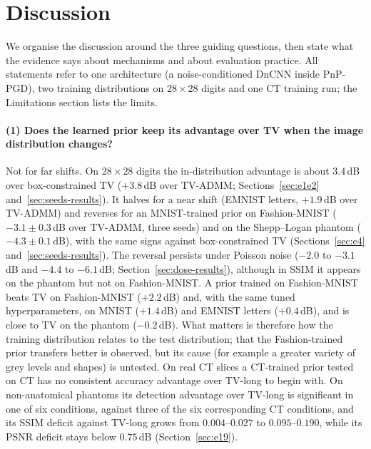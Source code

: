 \section{Discussion}
\label{sec:discussion}

We organise the discussion around the three guiding questions, then state what the evidence says about mechanisms and about evaluation practice. All statements refer to one architecture (a noise-conditioned DnCNN inside PnP-PGD), two training distributions on $28\times28$ digits and one CT training run; the Limitations section lists the limits.

\paragraph{(1) Does the learned prior keep its advantage over TV when the image distribution changes?}
Not for far shifts. On $28\times28$ digits the in-distribution advantage is about $3.4$\,dB over box-constrained TV ($+3.8$\,dB over TV-ADMM; Sections~\ref{sec:e1e2} and~\ref{sec:seeds-results}). It halves for a near shift (EMNIST letters, $+1.9$\,dB over TV-ADMM) and reverses for an MNIST-trained prior on Fashion-MNIST ($-3.1\pm0.3$\,dB over TV-ADMM, three seeds) and on the Shepp--Logan phantom ($-4.3\pm0.1$\,dB), with the same signs against box-constrained TV (Sections~\ref{sec:e4} and~\ref{sec:seeds-results}). The reversal persists under Poisson noise ($-2.0$ to $-3.1$\,dB and $-4.4$ to $-6.1$\,dB; Section~\ref{sec:dose-results}), although in SSIM it appears on the phantom but not on Fashion-MNIST.
A prior trained on Fashion-MNIST beats TV on Fashion-MNIST ($+2.2$\,dB) and, with the same tuned hyperparameters, on MNIST ($+1.4$\,dB) and EMNIST letters ($+0.4$\,dB), and is close to TV on the phantom ($-0.2$\,dB). What matters is therefore how the training distribution relates to the test distribution; that the Fashion-trained prior transfers better is observed, but its cause (for example a greater variety of grey levels and shapes) is untested.
On real CT slices a CT-trained prior tested on CT has no consistent accuracy advantage over TV-long to begin with. On non-anatomical phantoms its detection advantage over TV-long is significant in one of six conditions, against three of the six corresponding CT conditions, and its SSIM deficit against TV-long grows from $0.004$--$0.027$ to $0.095$--$0.190$, while its PSNR deficit stays below $0.75$\,dB (Section~\ref{sec:e19}).

